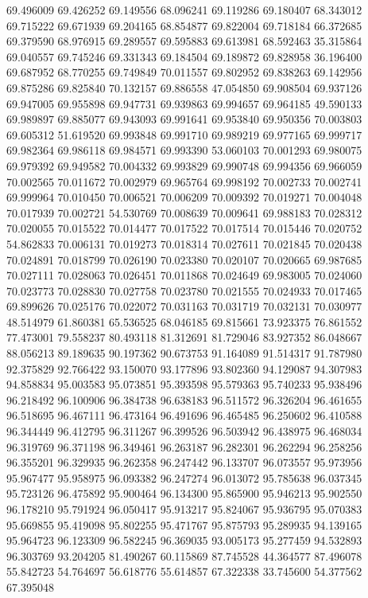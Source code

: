 69.496009
69.426252
69.149556
68.096241
69.119286
69.180407
68.343012
69.715222
69.671939
69.204165
68.854877
69.822004
69.718184
66.372685
69.379590
68.976915
69.289557
69.595883
69.613981
68.592463
35.315864
69.040557
69.745246
69.331343
69.184504
69.189872
69.828958
36.196400
69.687952
68.770255
69.749849
70.011557
69.802952
69.838263
69.142956
69.875286
69.825840
70.132157
69.886558
47.054850
69.908504
69.937126
69.947005
69.955898
69.947731
69.939863
69.994657
69.964185
49.590133
69.989897
69.885077
69.943093
69.991641
69.953840
69.950356
70.003803
69.605312
51.619520
69.993848
69.991710
69.989219
69.977165
69.999717
69.982364
69.986118
69.984571
69.993390
53.060103
70.001293
69.980075
69.979392
69.949582
70.004332
69.993829
69.990748
69.994356
69.966059
70.002565
70.011672
70.002979
69.965764
69.998192
70.002733
70.002741
69.999964
70.010450
70.006521
70.006209
70.009392
70.019271
70.004048
70.017939
70.002721
54.530769
70.008639
70.009641
69.988183
70.028312
70.020055
70.015522
70.014477
70.017522
70.017514
70.015446
70.020752
54.862833
70.006131
70.019273
70.018314
70.027611
70.021845
70.020438
70.024891
70.018799
70.026190
70.023380
70.020107
70.020665
69.987685
70.027111
70.028063
70.026451
70.011868
70.024649
69.983005
70.024060
70.023773
70.028830
70.027758
70.023780
70.021555
70.024933
70.017465
69.899626
70.025176
70.022072
70.031163
70.031719
70.032131
70.030977
48.514979
61.860381
65.536525
68.046185
69.815661
73.923375
76.861552
77.473001
79.558237
80.493118
81.312691
81.729046
83.927352
86.048667
88.056213
89.189635
90.197362
90.673753
91.164089
91.514317
91.787980
92.375829
92.766422
93.150070
93.177896
93.802360
94.129087
94.307983
94.858834
95.003583
95.073851
95.393598
95.579363
95.740233
95.938496
96.218492
96.100906
96.384738
96.638183
96.511572
96.326204
96.461655
96.518695
96.467111
96.473164
96.491696
96.465485
96.250602
96.410588
96.344449
96.412795
96.311267
96.399526
96.503942
96.438975
96.468034
96.319769
96.371198
96.349461
96.263187
96.282301
96.262294
96.258256
96.355201
96.329935
96.262358
96.247442
96.133707
96.073557
95.973956
95.967477
95.958975
96.093382
96.247274
96.013072
95.785638
96.037345
95.723126
96.475892
95.900464
96.134300
95.865900
95.946213
95.902550
96.178210
95.791924
96.050417
95.913217
95.824067
95.936795
95.070383
95.669855
95.419098
95.802255
95.471767
95.875793
95.289935
94.139165
95.964723
96.123309
96.582245
96.369035
93.005173
95.277459
94.532893
96.303769
93.204205
81.490267
60.115869
87.745528
44.364577
87.496078
55.842723
54.764697
56.618776
55.614857
67.322338
33.745600
54.377562
67.395048

